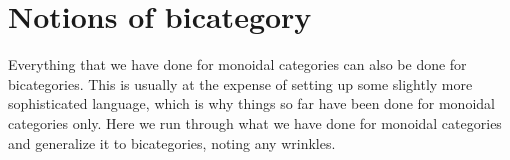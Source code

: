 \section{Notions of bicategory}


Everything that we have done for monoidal categories can also be done for
bicategories.  This is usually at the expense of setting up some slightly
more sophisticated language, which is why things so far have been done for
monoidal categories only.  Here we run through what we have done for
monoidal categories and generalize it to bicategories, noting any wrinkles.




